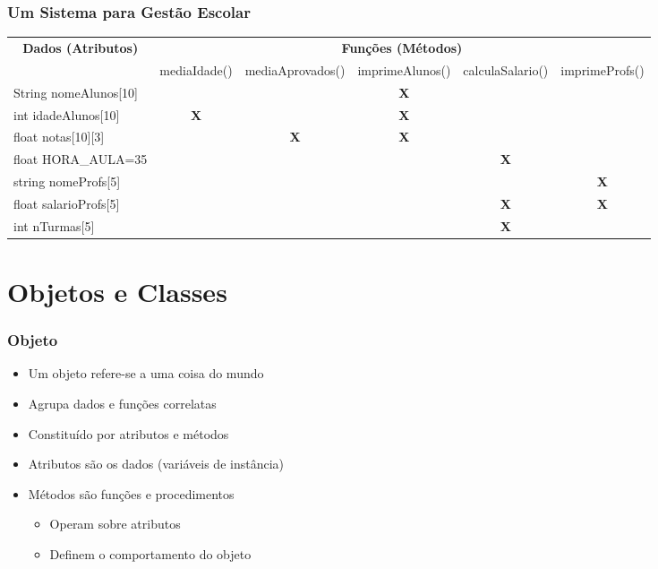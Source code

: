 \documentclass[aspectratio=169]{beamer}
\begin{document}
\begin{frame}\frametitle{Um Sistema para Gestão Escolar}

\begin{table}[]
\scriptsize{
\begin{tabular}{|l|l|l|l|l|l|}
\hline
\multicolumn{1}{|c|}{\multirow{2}{*}{\textbf{Dados (Atributos)}}} & \multicolumn{5}{c|}{\textbf{Funções (Métodos)}} \\ \cline{2-6} 
\multicolumn{1}{|c|}{} & mediaIdade() & mediaAprovados() & imprimeAlunos() & calculaSalario() & imprimeProfs() \\
\hline
String nomeAlunos{[}10{]} &  &  & \multicolumn{1}{c|}{\cellcolor{blue!25}\textbf{X}} &  &  \\
\hline
int idadeAlunos{[}10{]} & \multicolumn{1}{c|}{\cellcolor{blue!25}\textbf{X}} &  & \multicolumn{1}{c|}{\cellcolor{blue!25}\textbf{X}} &  &  \\
\hline
float notas{[}10{]}{[}3{]} &  & \multicolumn{1}{c|}{\cellcolor{blue!25}\textbf{X}} & \multicolumn{1}{c|}{\cellcolor{blue!25}\textbf{X}} &  &  \\
\hline
float HORA\_AULA=35 &  &  &  & \multicolumn{1}{c|}{\cellcolor{green!25}\textbf{X}} &  \\
\hline
string nomeProfs{[}5{]} &  &  &  &  & \multicolumn{1}{c|}{\cellcolor{green!25}\textbf{X}} \\
\hline
float salarioProfs{[}5{]} &  &  &  & \multicolumn{1}{c|}{\cellcolor{green!25}\textbf{X}} & \multicolumn{1}{c|}{\cellcolor{green!25}\textbf{X}} \\
\hline
int nTurmas{[}5{]} &  &  &  & \multicolumn{1}{c|}{\cellcolor{green!25}\textbf{X}} &  \\
\hline
\end{tabular}
}
\end{table}
\end{frame}

\section{Objetos e Classes}

\begin{frame}\frametitle{Objeto}
\begin{itemize}
	\item Um objeto refere-se a uma coisa do mundo
	\item Agrupa dados e funções correlatas
	\item Constituído por atributos e métodos
	\item Atributos são os dados (variáveis de instância)
	\item Métodos são funções e procedimentos
	\begin{itemize}
		\item Operam sobre atributos
		\item Definem o comportamento do objeto
	\end{itemize}
\end{itemize}
\end{frame}
\end{document}
